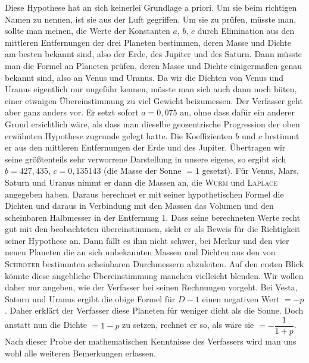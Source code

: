 Diese Hypothese hat an sich keinerlei Grundlage a priori. Um sie beim richtigen Namen zu nennen, ist sie aus der Luft gegriffen. Um sie zu prüfen, müsste man, sollte man meinen, die Werte der Konstanten $a$, $b$, $c$ durch Elimination aus den mittleren Entfernungen der drei Planeten bestimmen, deren Masse und Dichte am besten bekannt sind, also der Erde, des Jupiter und des Saturn. Dann müsste man die Formel an Planeten prüfen, deren Masse und Dichte einigermaßen genau bekannt sind, also an Venus und Uranus. Da wir die Dichten von Venus und Uranus eigentlich nur ungefähr kennen, müsste man sich auch dann noch hüten, einer etwaigen Übereinstimmung zu viel Gewicht beizumessen. Der Verfasser geht aber ganz anders vor. Er setzt sofort $a = \mathrm{0{,}075}$ an, ohne dass dafür ein anderer Grund ersichtlich wäre, als dass man dieselbe geozentrische Progression der oben erwähnten Hypothese zugrunde gelegt hatte. Die Koeffizienten $b$ und $c$ bestimmt er aus den mittleren Entfernungen der Erde und des Jupiter. Übertragen wir seine größtenteils sehr verworrene Darstellung in unsere eigene, so ergibt sich $b = \mathrm{427{,}435}$, $c = \mathrm{0{,}135143}$ (die Masse der Sonne $= \mathrm{1}$ gesetzt). Für Venus, Mars, Saturn und Uranus nimmt er dann die Massen an, die \textsc{Wurm} und \textsc{Laplace} angegeben haben. Daraus berechnet er mit seiner hypothetischen Formel die Dichten und daraus in Verbindung mit den Massen das Volumen und den scheinbaren Halbmesser in der Entfernung 1. Dass seine berechneten Werte recht gut mit den beobachteten übereinstimmen, sieht er als Beweis für die Richtigkeit seiner Hypothese an. Dann fällt es ihm nicht schwer, bei Merkur und den vier neuen Planeten die an sich unbekannten Massen und Dichten aus den von \textsc{Schröter} bestimmten scheinbaren Durchmessern abzuleiten. Auf den ersten Blick könnte diese angebliche Übereinstimmung manchen vielleicht blenden. Wir wollen daher nur angeben, wie der Verfasser bei seinen Rechnungen vorgeht. Bei Vesta, Saturn und Uranus ergibt die obige Formel für $D - \mathrm{1}$ einen negativen Wert $= -p$. Daher erklärt der Verfasser diese Planeten für weniger dicht als die Sonne. Doch anstatt nun die Dichte $= \mathrm{1} - p$ zu setzen, rechnet er so, als wäre sie $= -\dfrac{1}{1+p}$. Nach dieser Probe der mathematischen Kenntnisse des Verfassers wird man uns wohl alle weiteren Bemerkungen erlassen.

